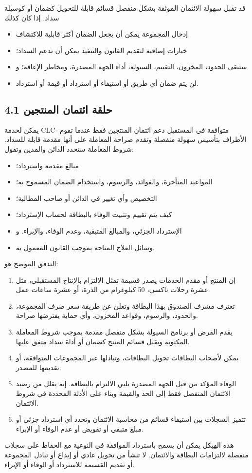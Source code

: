 \documentclass[11pt]{article}
\begin{document}
قد تقبل سهولة الائتمان الموثقة بشكل منفصل قسائم قابلة للتحويل كضمان أو كوسيلة سداد. إذا كان كذلك

\begin{itemize}[leftmargin=*]
\item إدخال المجموعة يمكن أن يجعل الضمان أكثر قابلية للاكتشاف
\item خيارات إضافية لتقديم القانون والتنفيذ يمكن أن تدعم السداد؛
\item ستبقى الحدود، المخزون، التقييم، السيولة، أداء الجهة المصدرة، ومخاطر الإعاقة؛ و
\item لن يتم ضمان أي طريق أو استيفاء أو استرداد أو قيمة أو استرداد.
\end{itemize}
\subsection*{4.1 حلقة ائتمان المنتجين}

يمكن لخدمة CLC- متوافقة في المستقبل دعم ائتمان المنتجين فقط عندما تقوم الأطراف بتأسيس سهولة منفصلة وتقدم صراحة المعاملة على أنها مقدمة قابلة للسداد. شروط المعاملة ستحدد الدائن والمدين وتقول:

\begin{itemize}[leftmargin=*]
\item مبالغ مقدمة واسترداد؛
\item المواعيد المتأخرة، والفوائد، والرسوم، واستخدام الضمان المسموح به؛
\item التخصيص وأي تغيير في الدائن أو صاحب المطالبة؛
\item كيف يتم تقييم وتثبيت الوفاء بالبطاقة لحساب الإسترداد؛
\item الإسترداد الجزئي، والمبالغ المتبقية، وعدم الوفاء، والإبراء. و
\item وسائل العلاج المتاحة بموجب القانون المعمول به.
\end{itemize}
التدفق الموضح هو:

\begin{enumerate}[leftmargin=*]
\item إن المنتج أو مقدم الخدمات يصدر قسيمة تمثل الالتزام بالإنتاج المستقبلي، مثل عشرة رحلات تاكسي، 50 كيلوغرام من الذرة، أو عشرة ساعات عمل.
\item تعترف مشرف الصندوق بهذا البطاقة وتعلن عن طريقة سعر صرف المجموعة، والحدود، والرسوم، وقواعد المخزون، وأي حماية يفترضها صراحة.
\item يقدم القرض أو برنامج السيولة بشكل منفصل مقدمة بموجب شروط المعاملة المكتوبة ويقبل قسائم المنتج كضمان أو أداة سداد متفق عليها.
\item يمكن لأصحاب البطاقات تحويل البطاقات، وتبادلها عبر المجموعات المتوافقة، أو تقديمها للمصدر.
\item الوفاء المؤكد من قبل الجهة المصدرة يلبي الالتزام بالبطاقة. إنه يقلل من رصيد الائتمان المنفصل فقط إلى الحد والقيمة وبناء على الأدلة المحددة في شروط الائتمان.
\item تتميز السجلات بين استيفاء قسائم من محاسبة الائتمان وتحدد أي استرداد جزئي أو مبلغ متبقي أو تفويض أو عدم الوفاء أو الإبراء.
\end{enumerate}
هذه الهيكل يمكن أن يسمح باسترداد الموافقة في النوعية مع الحفاظ على سجلات منفصلة لالتزامات البطاقة والائتمان. لا تنشأ من تحويل عادي أو إيداع أو تبادل المجموعة أو تقديم القسيمة للاسترداد أو الوفاء أو الإبراء.
\end{document}
